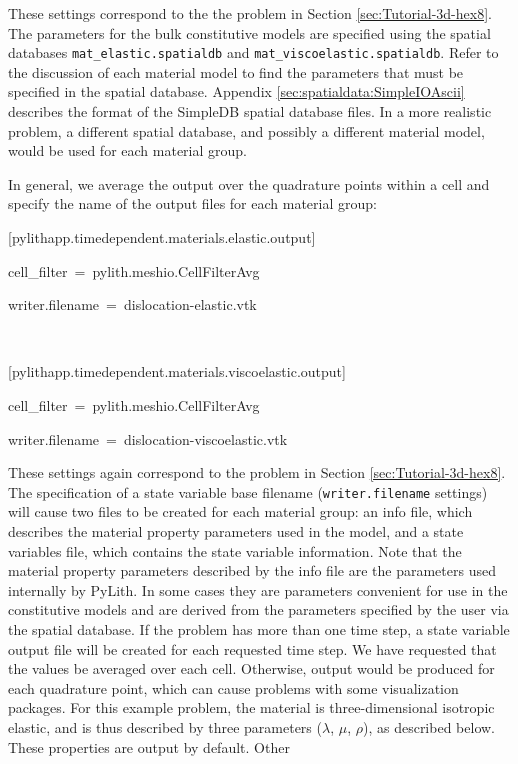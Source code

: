 These settings correspond to the the problem in Section \vref{sec:Tutorial-3d-hex8}.
The parameters for the bulk constitutive models are specified using
the spatial databases \texttt{mat\_elastic.spatialdb} and \texttt{mat\_viscoelastic.spatialdb}.
Refer to the discussion of each material model to find the parameters
that must be specified in the spatial database. Appendix \vref{sec:spatialdata:SimpleIOAscii}
describes the format of the SimpleDB spatial database files. In a
more realistic problem, a different spatial database, and possibly
a different material model, would be used for each material group.

In general, we average the output over the quadrature points within
a cell and specify the name of the output files for each material
group:
\begin{lyxcode}
{[}pylithapp.timedependent.materials.elastic.output{]}

cell\_filter~=~pylith.meshio.CellFilterAvg

writer.filename~=~dislocation-elastic.vtk

~

{[}pylithapp.timedependent.materials.viscoelastic.output{]}

cell\_filter~=~pylith.meshio.CellFilterAvg

writer.filename~=~dislocation-viscoelastic.vtk
\end{lyxcode}
These settings again correspond to the problem in Section \vref{sec:Tutorial-3d-hex8}.
The specification of a state variable base filename (\texttt{writer.filename}
settings) will cause two files to be created for each material group:
an info file, which describes the material property parameters used
in the model, and a state variables file, which contains the state
variable information. Note that the material property parameters described
by the info file are the parameters used internally by PyLith. In
some cases they are parameters convenient for use in the constitutive
models and are derived from the parameters specified by the user via
the spatial database. If the problem has more than one time step,
a state variable output file will be created for each requested time
step. We have requested that the values be averaged over each cell.
Otherwise, output would be produced for each quadrature point, which
can cause problems with some visualization packages. For this example
problem, the material is three-dimensional isotropic elastic, and
is thus described by three parameters ($\lambda$, $\mu$, $\rho$),
as described below. These properties are output by default. Other
